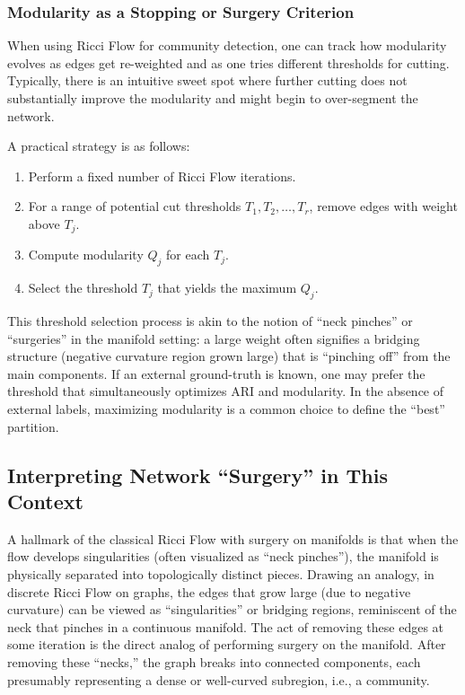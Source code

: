 \subsubsection{Modularity as a Stopping or Surgery Criterion}
When using Ricci Flow for community detection, one can track how modularity evolves as edges get re-weighted and as one tries different thresholds for cutting. Typically, there is an intuitive sweet spot where further cutting does not substantially improve the modularity and might begin to over-segment the network. 

A practical strategy is as follows:
\begin{enumerate}
    \item Perform a fixed number of Ricci Flow iterations. 
    \item For a range of potential cut thresholds $T_1, T_2, \dots, T_r$, remove edges with weight above $T_j$. 
    \item Compute modularity $Q_j$ for each $T_j$.
    \item Select the threshold $T_j$ that yields the maximum $Q_j$.
\end{enumerate}
This threshold selection process is akin to the notion of “neck pinches” or “surgeries” in the manifold setting: a large weight often signifies a bridging structure (negative curvature region grown large) that is “pinching off” from the main components. If an external ground-truth is known, one may prefer the threshold that simultaneously optimizes ARI and modularity. In the absence of external labels, maximizing modularity is a common choice to define the “best” partition.

\subsection{Interpreting Network ``Surgery'' in This Context}
\label{subsec:surgery}

A hallmark of the classical Ricci Flow with surgery on manifolds is that when the flow develops singularities (often visualized as “neck pinches”), the manifold is physically separated into topologically distinct pieces. Drawing an analogy, in discrete Ricci Flow on graphs, the edges that grow large (due to negative curvature) can be viewed as “singularities” or bridging regions, reminiscent of the neck that pinches in a continuous manifold. The act of removing these edges at some iteration is the direct analog of performing surgery on the manifold. After removing these “necks,” the graph breaks into connected components, each presumably representing a dense or well-curved subregion, i.e., a community.


